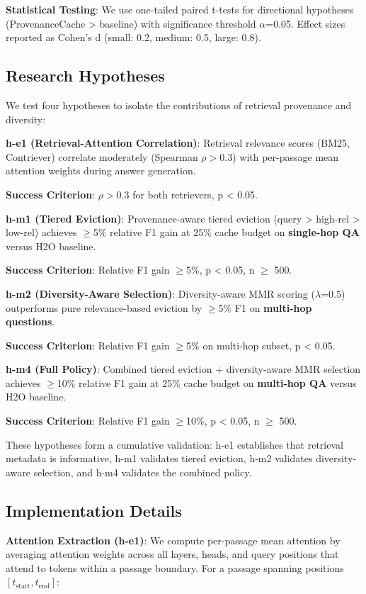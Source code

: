 \textbf{Statistical Testing}: We use one-tailed paired t-tests for directional hypotheses (ProvenanceCache > baseline) with significance threshold $\alpha$=0.05. Effect sizes reported as Cohen's d (small: 0.2, medium: 0.5, large: 0.8).

\subsection{Research Hypotheses}

We test four hypotheses to isolate the contributions of retrieval provenance and diversity:

\textbf{h-e1 (Retrieval-Attention Correlation)}: Retrieval relevance scores (BM25, Contriever) correlate moderately (Spearman $\rho > 0.3$) with per-passage mean attention weights during answer generation.

\textbf{Success Criterion}: $\rho > 0.3$ for both retrievers, p < 0.05.

\textbf{h-m1 (Tiered Eviction)}: Provenance-aware tiered eviction (query > high-rel > low-rel) achieves $\geq$5\% relative F1 gain at 25\% cache budget on \textbf{single-hop QA} versus H2O baseline.

\textbf{Success Criterion}: Relative F1 gain $\geq$5\%, p < 0.05, n $\geq$ 500.

\textbf{h-m2 (Diversity-Aware Selection)}: Diversity-aware MMR scoring ($\lambda$=0.5) outperforms pure relevance-based eviction by $\geq$5\% F1 on \textbf{multi-hop questions}.

\textbf{Success Criterion}: Relative F1 gain $\geq$5\% on multi-hop subset, p < 0.05.

\textbf{h-m4 (Full Policy)}: Combined tiered eviction + diversity-aware MMR selection achieves $\geq$10\% relative F1 gain at 25\% cache budget on \textbf{multi-hop QA} versus H2O baseline.

\textbf{Success Criterion}: Relative F1 gain $\geq$10\%, p < 0.05, n $\geq$ 500.

These hypotheses form a cumulative validation: h-e1 establishes that retrieval metadata is informative, h-m1 validates tiered eviction, h-m2 validates diversity-aware selection, and h-m4 validates the combined policy.

\subsection{Implementation Details}

\textbf{Attention Extraction (h-e1)}: We compute per-passage mean attention by averaging attention weights across all layers, heads, and query positions that attend to tokens within a passage boundary. For a passage spanning positions $[t_{\text{start}}, t_{\text{end}}]$:

